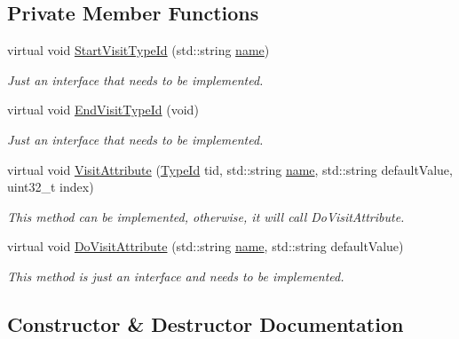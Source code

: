 \subsection*{Private Member Functions}
\begin{DoxyCompactItemize}
\item 
virtual void \hyperlink{classns3_1_1AttributeDefaultIterator_ad83068183f54517ea6cc0065709f2c1f}{Start\+Visit\+Type\+Id} (std\+::string \hyperlink{generate__test__data__lte__spectrum__model_8m_ab74e6bf80237ddc4109968cedc58c151}{name})
\begin{DoxyCompactList}\small\item\em Just an interface that needs to be implemented. \end{DoxyCompactList}\item 
virtual void \hyperlink{classns3_1_1AttributeDefaultIterator_a1362813a873760a03b966b99acd28e1b}{End\+Visit\+Type\+Id} (void)
\begin{DoxyCompactList}\small\item\em Just an interface that needs to be implemented. \end{DoxyCompactList}\item 
virtual void \hyperlink{classns3_1_1AttributeDefaultIterator_a72a2497a0d333b1153b3ea9824d4defa}{Visit\+Attribute} (\hyperlink{classns3_1_1TypeId}{Type\+Id} tid, std\+::string \hyperlink{generate__test__data__lte__spectrum__model_8m_ab74e6bf80237ddc4109968cedc58c151}{name}, std\+::string default\+Value, uint32\+\_\+t index)
\begin{DoxyCompactList}\small\item\em This method can be implemented, otherwise, it will call Do\+Visit\+Attribute. \end{DoxyCompactList}\item 
virtual void \hyperlink{classns3_1_1AttributeDefaultIterator_ac9f9140de79896832e110f9ea718bd2f}{Do\+Visit\+Attribute} (std\+::string \hyperlink{generate__test__data__lte__spectrum__model_8m_ab74e6bf80237ddc4109968cedc58c151}{name}, std\+::string default\+Value)
\begin{DoxyCompactList}\small\item\em This method is just an interface and needs to be implemented. \end{DoxyCompactList}\end{DoxyCompactItemize}


\subsection{Constructor \& Destructor Documentation}
